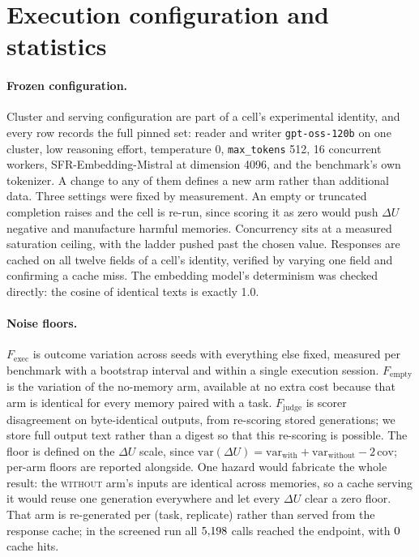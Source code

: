 \section{Execution configuration and statistics}
\label{sec:config}

\paragraph{Frozen configuration.}
Cluster and serving configuration are part of a cell's experimental
identity, and every row records the full pinned set: reader and writer
\texttt{gpt-oss-120b} on one cluster, low reasoning effort,
temperature 0, \texttt{max\_tokens} 512, 16 concurrent workers,
SFR-Embedding-\allowbreak Mistral at dimension 4096, and the benchmark's own tokenizer. A
change to any of them defines a new arm rather than additional data. Three
settings were fixed by measurement. An empty or truncated completion raises
and the cell is re-run, since scoring it as zero would push $\Delta U$
negative and manufacture harmful memories. Concurrency sits at a measured
saturation ceiling, with the ladder pushed past the chosen value. Responses
are cached on all twelve fields of a cell's identity, verified by varying one
field and confirming a cache miss. The embedding model's determinism was
checked directly: the cosine of identical texts is exactly 1.0.

\paragraph{Noise floors.}
\label{sec:floors}
$F_{\mathrm{exec}}$ is outcome variation across seeds with everything else
fixed, measured per benchmark with a bootstrap interval and within a single
execution session. $F_{\mathrm{empty}}$ is the variation of the no-memory
arm, available at no extra cost because that arm is identical for every
memory paired with a task. $F_{\mathrm{judge}}$ is scorer disagreement on
byte-identical outputs, from re-scoring stored generations; we store full
output text rather than a digest so that this re-scoring is possible. The
floor is defined on the $\Delta U$ scale, since
$\mathrm{var}(\Delta U) = \mathrm{var}_{\mathrm{with}} +
\mathrm{var}_{\mathrm{without}} - 2\,\mathrm{cov}$; per-arm floors are
reported alongside. One hazard would fabricate the whole result: the
\textsc{without} arm's inputs are identical across memories, so a cache
serving it would reuse one generation everywhere and let every $\Delta U$
clear a zero floor. That arm is re-generated per (task, replicate) rather than served from the
response cache; in the screened run all $5{,}198$ calls reached the
endpoint, with $0$ cache hits.


